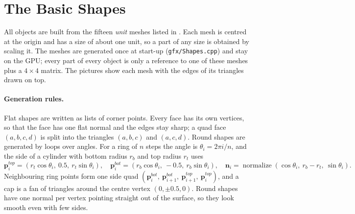 \section{The Basic Shapes}\label{sec:shapes}
All objects are built from the fifteen \emph{unit} meshes listed in . Each mesh is
centred at the origin and has a size of about one unit, so a part of any size is obtained by scaling it.
The meshes are generated once at start-up (\texttt{gfx/Shapes.cpp}) and stay on the GPU; every part of
every object is only a reference to one of these meshes plus a $4\times4$ matrix. The pictures show each
mesh with the edges of its triangles drawn on top.

\paragraph{Generation rules.} Flat shapes are written as lists of corner points. Every face has its own
vertices, so that the face has one flat normal and the edges stay sharp; a quad face $(a,b,c,d)$ is split
into the triangles $(a,b,c)$ and $(a,c,d)$. Round shapes are generated by loops over angles. For a ring of
$n$ steps the angle is $\theta_i = 2\pi i/n$, and the side of a cylinder with bottom radius $r_b$ and top
radius $r_t$ uses
\[
\mathbf{p}_i^{top} = (r_t\cos\theta_i,\ 0.5,\ r_t\sin\theta_i),\quad
\mathbf{p}_i^{bot} = (r_b\cos\theta_i,\ -0.5,\ r_b\sin\theta_i),\quad
\mathbf{n}_i = \operatorname{normalize}(\cos\theta_i,\ r_b-r_t,\ \sin\theta_i).
\]
Neighbouring ring points form one side quad
$(\mathbf{p}_i^{bot},\ \mathbf{p}_{i+1}^{bot},\ \mathbf{p}_{i+1}^{top},\ \mathbf{p}_i^{top})$,
and a cap is a fan of triangles around the centre vertex $(0,\pm0.5,0)$. Round shapes have one normal per
vertex pointing straight out of the surface, so they look smooth even with few sides.

